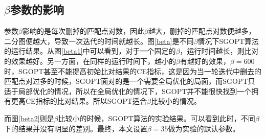 \subsection{$\beta$参数的影响}
参数$\beta$影响的是每次删掉的匹配点对数，因此$\beta$越大，删掉的匹配点对数便越多，二分图便越大，导致一次迭代的时间就越长。图\ref{beta}是不同$\beta$情况下SGOPT算法的运行结果。从图\ref{beta1}中可以看到，对于一个固定的$\beta$，运行时间越长，则比对的效果越好。另一方面，在同样的运行时间下，越小的$\beta$有越好的效果，$\beta=600$时，SGOPT甚至不能提高初始比对结果的CE指标，这是因为当一轮迭代中删去的匹配点对过多的时候，SGOPT面对的是一个需要全局优化的局面，而SGOPT只适于局部优化的情况，所以在全局优化的情况下，SGOPT并不能很快找到一个拥有更高CE指标的比对结果。所以SGOPT适合$\beta$比较小的情况。

而图\ref{beta2}则是$\beta$比较小的时候，SGOPT算法的实验结果。可以看到此时，不同$\beta$下的结果并没有明显的差别。最终，本文设置$\beta=35$做为实验的默认参数。


